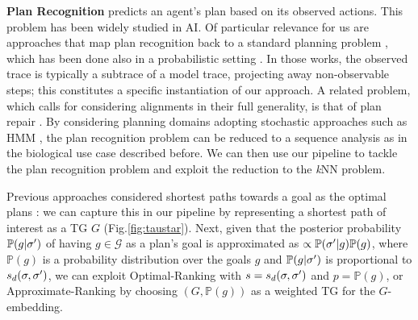 
\smallskip
\noindent
\textbf{Plan Recognition}
 predicts an agent's plan based on its observed actions. This problem has been widely studied in AI. Of particular relevance for us are approaches that map plan recognition back to a standard planning problem \cite{RamirezG09}, which has been done also in a probabilistic setting \cite{RamirezG10}. In those works, the observed trace is typically a subtrace of a model trace, projecting away non-observable steps; this constitutes a specific instantiation of our approach. 
A related problem, which calls for considering alignments in their full generality, is that of plan repair \cite{FoxGLS06}. 
By considering planning domains adopting stochastic approaches such as HMM \cite{LI2020101974}, the plan recognition problem can be reduced to a sequence analysis as in the biological use case described before. We can then use our pipeline to tackle the plan recognition problem and exploit the reduction to the \textit{k}NN problem. %


Previous approaches considered shortest paths towards a goal as the optimal plans \cite{RamirezG10}: we can capture this in our pipeline by %
representing a shortest path of interest as a TG $G$ (Fig.\ref{fig:taustar}). Next, given that the posterior probability $\mathbb{P}(g|{\sigma'})$ of having $g\in\mathcal{G}$ as a plan's goal is approximated  as $\propto \mathbb{P}({\sigma'}|g)\mathbb{P}(g)$, where $\mathbb{P}(g)$ is a probability distribution  over the goals $g$ and $\mathbb{P}(g|{\sigma'})$ is  proportional to $s_d(\sigma,{\sigma'})$, we can exploit Optimal-Ranking with $s=s_d(\sigma,{\sigma'})$ and $p=\mathbb{P}(g)$, or Approximate-Ranking by choosing $(G,\mathbb{P}(g))$ as a weighted TG for the $G$-embedding.